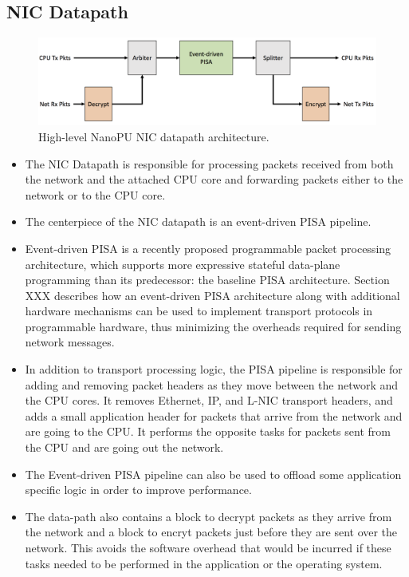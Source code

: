 \subsection{NIC Datapath}
\begin{figure}
  \includegraphics[width=\linewidth]{./figures/NIC-Datapath}
  \caption{High-level NanoPU NIC datapath architecture.}
  \label{fig:NIC-Datapath}
\end{figure}
\begin{itemize}
    \item The NIC Datapath is responsible for processing packets received from both the network and the attached CPU core and forwarding packets either to the network or to the CPU core.
    \item The centerpiece of the NIC datapath is an event-driven PISA pipeline.
    \item Event-driven PISA is a recently proposed programmable packet processing architecture, which supports more expressive stateful data-plane programming than its predecessor: the baseline PISA architecture. Section XXX describes how an event-driven PISA architecture along with additional hardware mechanisms can be used to implement transport protocols in programmable hardware, thus minimizing the overheads required for sending network messages.
    \item In addition to transport processing logic, the PISA pipeline is responsible for adding and removing packet headers as they move between the network and the CPU cores. It removes Ethernet, IP, and L-NIC transport headers, and adds a small application header for packets that arrive from the network and are going to the CPU. It performs the opposite tasks for packets sent from the CPU and are going out the network.
    \item The Event-driven PISA pipeline can also be used to offload some application specific logic in order to improve performance. 
    \item The data-path also contains a block to decrypt packets as they arrive from the network and a block to encryt packets just before they are sent over the network. This avoids the software overhead that would be incurred if these tasks needed to be performed in the application or the operating system.
\end{itemize}

